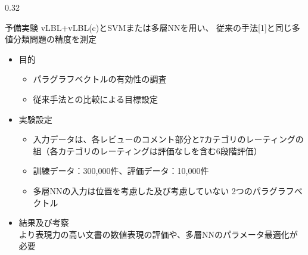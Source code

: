\documentclass[8pt,unicode]{beamer}
\newcommand{\columnscale}{0.32}
\newcommand{\itemtitle}[1]{{\normalsize #1} \\}
\begin{document}
\begin{frame}{}
\begin{columns}[t]
\begin{column}{\columnscale\textwidth} %
  \begin{block}{予備実験}
    vLBL+vLBL(c)とSVMまたは多層NNを用い、
    従来の手法[1]と同じ多値分類問題の精度を測定

    \begin{itemize}
      \item \itemtitle{目的}
      \begin{itemize}
        \item パラグラフベクトルの有効性の調査
        \item 従来手法との比較による目標設定
      \end{itemize}

      \item \itemtitle{実験設定}
      \begin{itemize}
        \item 入力データは、各レビューのコメント部分と7カテゴリのレーティングの
        組（各カテゴリのレーティングは評価なしを含む6段階評価）
        \item 訓練データ：300,000件、評価データ：10,000件
        \item 多層NNの入力は位置を考慮した及び考慮していない
        2つのパラグラフベクトル
      \end{itemize}

      \item \itemtitle{結果及び考察}
        より表現力の高い文書の数値表現の評価や、多層NNのパラメータ最適化が必要


    \end{itemize}


\end{block}
\end{column}
\end{columns}
\end{frame}
\end{document}
